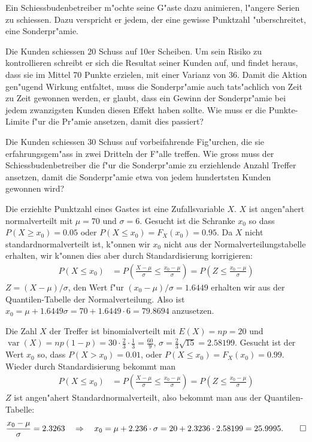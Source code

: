 Ein Schiessbudenbetreiber m"ochte seine G"aste dazu animieren,
l"angere Serien zu schiessen. Dazu verspricht er jedem, der eine
gewisse Punktzahl "uberschreitet, eine Sonderpr"amie.
\begin{teilaufgaben}
\item
Die Kunden schiessen 20 Schuss auf 10er Scheiben. Um sein Risiko
zu kontrollieren schreibt er sich die Resultat seiner Kunden auf,
und findet heraus, dass sie im Mittel 70 Punkte erzielen, mit einer
Varianz von 36. Damit die Aktion gen"ugend Wirkung entfaltet,
muss die Sonderpr"amie auch tats"achlich von Zeit zu Zeit
gewonnen werden, er glaubt, dass ein Gewinn der Sonderpr"amie
bei jedem zwanzigsten Kunden diesen Effekt haben sollte. Wie
muss er die Punkte-Limite f"ur die Pr"amie ansetzen, damit dies
passiert?
\item
Die Kunden schiessen 30 Schuss auf vorbeifahrende Fig"urchen, die
sie erfahrungsgem"ass in zwei Dritteln der F"alle treffen. Wie
gross muss der Schiessbudenbetreiber die f"ur die Sonderpr"amie
zu erziehlende Anzahl Treffer ansetzen, damit die Sonderpr"amie
etwa von jedem hundertsten Kunden gewonnen wird?
\end{teilaufgaben}

\begin{loesung}
\begin{teilaufgaben}
\item
Die erziehlte Punktzahl eines Gastes ist eine Zufallsvariable $X$.
$X$ ist angen"ahert normalverteilt mit $\mu=70$ und
$\sigma=6$. Gesucht ist die Schranke $x_0$ so dass
$P(X\ge x_0)=0.05$ oder $P(X\le x_0)=F_X(x_0)=0.95$.
Da $X$ nicht standardnormalverteilt ist, k"onnen wir $x_0$ nicht
aus der Normalverteilungstabelle erhalten, wir k"onnen dies aber
durch Standardisierung korrigieren:
\begin{align*}
P(X\le x_0)
&=
P\left(\frac{X-\mu}{\sigma}\le\frac{x_0-\mu}{\sigma}\right)
=
P\left(Z\le \frac{x_0-\mu}{\sigma}\right)
\end{align*}
$Z=(X-\mu)/\sigma$, den Wert f"ur $(x_0-\mu)/\sigma=1.6449$ erhalten
wir aus der Quantilen-Tabelle der Normalverteilung. Also ist
$x_0=\mu +1.6449\sigma=70 + 1.6449\cdot 6=79.8694$ anzusetzen.
\item
Die Zahl $X$ der Treffer ist binomialverteilt mit $E(X) = np=20$ und
$\operatorname{var}(X)=np(1-p)=30\cdot\frac23\cdot\frac13=\frac{60}{9}$,
$\sigma = \frac23\sqrt{15}=2.58199$.
Gesucht ist der Wert $x_0$ so, dass $P(X>x_0)=0.01$, oder
$P(X\le x_0)=F_X(x_0)=0.99$. Wieder durch Standardisierung bekommt
man
\begin{align*}
P(X\le x_0)
&=
P\left(
\frac{X-\mu}{\sigma}\le\frac{x_0-\mu}{\sigma}
\right)
=
P\left(
Z\le \frac{x_0-\mu}{\sigma}
\right)
\end{align*}
$Z$ ist angen"ahert Standardnormalverteilt, also bekommt man aus
der Quantilen-Tabelle:
\[
\frac{x_0-\mu}{\sigma}=2.3263
\quad
\Rightarrow
\quad
x_0=\mu+2.236\cdot \sigma=20 + 2.3236\cdot 2.58199 = 25.9995.
\qedhere
\]
\end{teilaufgaben}
\end{loesung}

